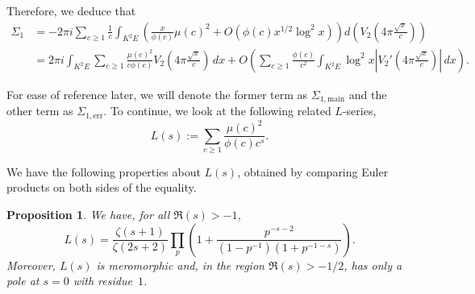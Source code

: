 \documentclass[reqno, 12pt]{amsart}
\newtheorem{prop}{Proposition}
\newcommand{\main}{\mathrm{main}}
\newcommand{\err}{\mathrm{err}}
\renewcommand{\geq}{\geqslant}
\begin{document}
Therefore, we deduce that
\begin{align}
  \Sigma_1 &=  -2\pi i \sum_{c \geq 1} \frac{1}{c} \int_{K^2E} \left( \frac{x}{\phi(c)} \mu(c)^2 + O(\phi(c) x^{1/2} \log^2 x) \right) d\left(V_2 \left( 4\pi \frac{\sqrt{x}}{c} \right) \right) \\
  &= 2\pi i \int_{K^2E} \sum_{c \geq 1} \frac{\mu(c)^2}{c\phi(c)} V_2 \left( 4\pi \frac{\sqrt{x}}{c} \right) \,dx + O \left( \sum_{c \geq 1} \frac{\phi(c)}{c^2} \int_{K^2E} \log^2 x \left| V_2' \left( 4\pi \frac{\sqrt{x}}{c} \right) \right| \,dx \right).
  \label{eq:after_decorrelation}
\end{align}

{For ease of reference later, we will denote the former term as $\Sigma_{1,\main}$ and the other term as $\Sigma_{1,\err}$.} {To continue, we} look at {the following related $L$}-series, 
\begin{equation}
L(s) := \sum_{c \geqslant 1} \frac{\mu(c)^2}{\phi(c) c^s}.
\end{equation}

We have the following properties about $L(s)$, obtained by comparing Euler products on both sides of the equality.
\begin{prop}
\label{prop:L}
We have, for all $\Re(s) > -1$, 
\begin{equation}
L(s) = \frac{\zeta(s+1)}{\zeta(2s+2)} \prod_p \left( 1 + \frac{p^{-s-2}}{(1-p^{-1})(1+p^{-1-s})} \right).
\end{equation}
Moreover, $L(s)$ is meromorphic and, in the region $\Re(s)>-1/2$, has only a pole at $s=0$ with residue~$1$.
\end{prop}
\end{document}
